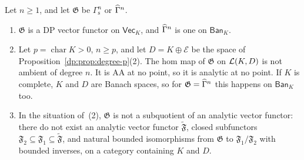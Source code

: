 \begin{proposition}\label{dp:prop:gamma-not-ambient}
Let $n\ge1$, and let $\mathfrak G$ be $\Gamma^n_{\mathrm s}$ or $\widehat\Gamma^n$.
\begin{enumerate}
\item $\mathfrak G$ is a DP vector functor on $\mathsf{Vec}_K$, and $\widehat\Gamma^n$ is one on $\mathsf{Ban}_K$.
\item Let $p=\operatorname{char}K>0$, $n\ge p$, and let $D=K\oplus\mathcal E$ be the space of Proposition~\ref{dp:prop:degree-p}\textup{(2)}. The hom map of $\mathfrak G$ on $\mathcal L(K,D)$ is not ambient of degree $n$. It is AA at no point, so it is analytic at no point. If $K$ is complete, $K$ and $D$ are Banach spaces, so for $\mathfrak G=\widehat\Gamma^n$ this happens on $\mathsf{Ban}_K$ too.
\item In the situation of~\textup{(2)}, $\mathfrak G$ is not a subquotient of an analytic vector functor: there do not exist an analytic vector functor $\widetilde{\mathfrak F}$, closed subfunctors $\mathfrak F_2\subseteq\mathfrak F_1\subseteq\widetilde{\mathfrak F}$, and natural bounded isomorphisms from $\mathfrak G$ to $\mathfrak F_1/\mathfrak F_2$ with bounded inverses, on a category containing $K$ and $D$.
\end{enumerate}
\end{proposition}

